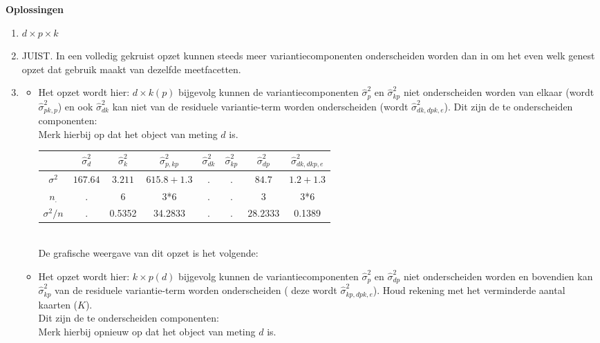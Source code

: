 \OPLOSSING
{
\textbf{Oplossingen}
\begin{enumerate}
\item $d \times p \times k$

\item JUIST. In een volledig gekruist opzet kunnen steeds meer variantiecomponenten onderscheiden worden dan in om het even welk genest opzet dat gebruik maakt van dezelfde meetfacetten. 
\item
\begin{itemize}
	\item Het opzet wordt hier: $d \times k\left(p\right)$ bijgevolg kunnen de variantiecomponenten $\hat{\sigma}^2_p$ en $\hat{\sigma}^2_{kp}$ niet onderscheiden worden van elkaar (wordt $\hat{\sigma}^2_{pk,p}$) en ook $\hat{\sigma}^2_{dk}$ kan niet van de residuele variantie-term worden onderscheiden (wordt $\hat{\sigma}^2_{dk, dpk,e}$). Dit zijn de te onderscheiden componenten:\\ Merk hierbij op dat het object van meting $d$ is. \\
	\begin{tabular}{|c|c|c|c|c|c|c|c|} \hline
	 & $ \hat{\sigma}^2_{d}$ & $ \hat{\sigma}^2_{k} $& $ \hat{\sigma}^2_{p,kp} $ & $ \hat{\sigma}^2_{dk}$ & $\hat{\sigma}^2_{kp} $ & $ \hat{\sigma}^2_{dp} $& $ \hat{\sigma}^2_{dk, dkp, e} $ \\ \hline
	$\sigma^2$  			& $ 167.64 $ 			& $ 3.211 $ 			& $615.8+1.3  $ 			& $ .$				 & $. $	& $ 84.7 $	 & $ 1.2 + 1.3  $ \\
	$n_.$				& .						& 6						& 3*6				 		& $ .$		  		 & $. $	& $ 3 $		 &  3*6 \\ \hline
	$\sigma^2 / n$ 		& .						& 0.5352				& 34.2833				 	& $ .$			  	 & $. $	& $ 28.2333 $& 0.1389 \\ \hline
	\end{tabular} \\
	De grafische weergave van dit opzet is het volgende:\\
	
	
	\item Het opzet wordt hier: $k \times p(d)$ bijgevolg kunnen de variantiecomponenten $\hat{\sigma}^2_p$ en $\hat{\sigma}^2_{dp}$ niet onderscheiden worden en bovendien kan $\hat{\sigma}^2_{kp}$ van de residuele variantie-term worden onderscheiden ( deze wordt $\hat{\sigma}^2_{kp, dpk, e}$). Houd rekening met het verminderde aantal kaarten ($K$).\\Dit zijn de te onderscheiden componenten:\\ Merk hierbij opnieuw op dat het object van meting $d$ is. \\


\end{itemize}
\end{enumerate}}
